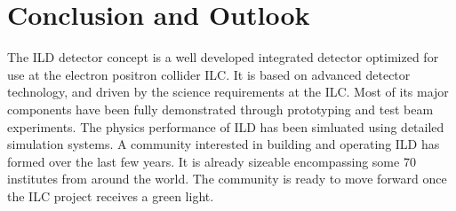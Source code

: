 \documentclass[%
 amsmath,amssymb,
 aps,
]{revtex4-1}
\begin{document}
\section{Conclusion and Outlook}
The ILD detector concept is a well developed integrated detector optimized for use at the electron positron collider ILC. It is based on advanced detector technology, and driven by the science requirements at the ILC. Most of its major components have been fully demonstrated through prototyping and test beam experiments. The physics performance of ILD has been simluated using detailed simulation systems. A community interested in building and operating ILD has formed over the last few years. It is already sizeable encompassing some 70 institutes from around the world. The community is ready to move forward once the ILC project receives a green light. 




\end{document}
